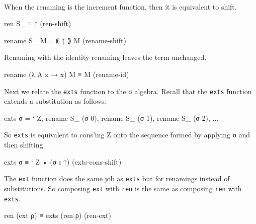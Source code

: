 \begin{fence}
\begin{code}%
\>[0]\AgdaSpace{}%
\AgdaSymbol{:}\AgdaSpace{}%
\AgdaSpace{}%
\AgdaSymbol{\}}\AgdaSpace{}%
\AgdaSpace{}%
\AgdaSpace{}%
\AgdaSpace{}%
\AgdaSpace{}%
\AgdaSpace{}%
\AgdaSpace{}%
\AgdaSpace{}%
\<%
\\
\>[0]\AgdaSpace{}%
\AgdaSpace{}%
\AgdaSymbol{=}\AgdaSpace{}%
\AgdaSpace{}%
\AgdaSpace{}%
\<%
\end{code}
\end{fence}

When the renaming is the increment function, then it is equivalent to
shift.

\begin{myDisplay}
ren S_ ≡ ↑                             (ren-shift)

rename S_ M ≡ ⟪ ↑ ⟫ M                  (rename-shift)
\end{myDisplay}

Renaming with the identity renaming leaves the term unchanged.

\begin{myDisplay}
rename (λ {A} x → x) M ≡ M             (rename-id)
\end{myDisplay}

Next we relate the \texttt{exts} function to the σ algebra. Recall that
the \texttt{exts} function extends a substitution as follows:

\begin{myDisplay}
exts σ = ` Z, rename S_ (σ 0), rename S_ (σ 1), rename S_ (σ 2), ...
\end{myDisplay}

So \texttt{exts} is equivalent to cons'ing Z onto the sequence formed by
applying \texttt{σ} and then shifting.

\begin{myDisplay}
exts σ ≡ ` Z • (σ ⨟ ↑)                (exts-cons-shift)
\end{myDisplay}

The \texttt{ext} function does the same job as \texttt{exts} but for
renamings instead of substitutions. So composing \texttt{ext} with
\texttt{ren} is the same as composing \texttt{ren} with \texttt{exts}.

\begin{myDisplay}
ren (ext ρ) ≡ exts (ren ρ)            (ren-ext)
\end{myDisplay}


